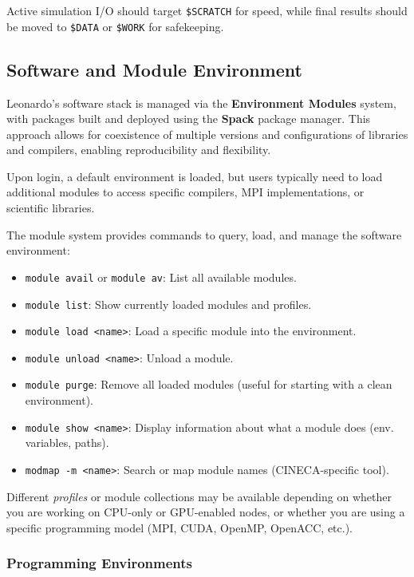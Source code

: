 Active simulation I/O should target \texttt{\$SCRATCH} for speed, while final results should be moved to \texttt{\$DATA} or \texttt{\$WORK} for safekeeping.

\subsection{Software and Module Environment}

Leonardo's software stack is managed via the \textbf{Environment Modules} system, with packages built and deployed using the \textbf{Spack} package manager. This approach allows for coexistence of multiple versions and configurations of libraries and compilers, enabling reproducibility and flexibility.

Upon login, a default environment is loaded, but users typically need to load additional modules to access specific compilers, MPI implementations, or scientific libraries. 

The module system provides commands to query, load, and manage the software environment:

\begin{itemize}
    \item \texttt{module avail} or \texttt{module av}: List all available modules.
    \item \texttt{module list}: Show currently loaded modules and profiles.
    \item \texttt{module load <name>}: Load a specific module into the environment.
    \item \texttt{module unload <name>}: Unload a module.
    \item \texttt{module purge}: Remove all loaded modules (useful for starting with a clean environment).
    \item \texttt{module show <name>}: Display information about what a module does (env. variables, paths).
    \item \texttt{modmap -m <name>}: Search or map module names (CINECA-specific tool).
\end{itemize}

Different \textit{profiles} or module collections may be available depending on whether you are working on CPU-only or GPU-enabled nodes, or whether you are using a specific programming model (MPI, CUDA, OpenMP, OpenACC, etc.).

\subsubsection{Programming Environments}

